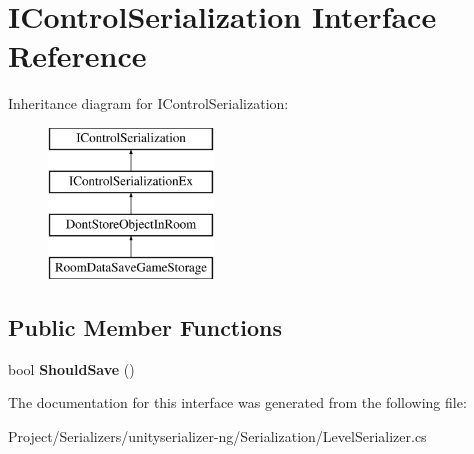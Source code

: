 \hypertarget{interface_i_control_serialization}{}\section{I\+Control\+Serialization Interface Reference}
\label{interface_i_control_serialization}
Inheritance diagram for I\+Control\+Serialization\+:\begin{figure}[H]
\begin{center}
\leavevmode
\includegraphics[height=4.000000cm]{interface_i_control_serialization}
\end{center}
\end{figure}
\subsection*{Public Member Functions}
\begin{DoxyCompactItemize}
\item 
\mbox{\label{interface_i_control_serialization_af1036cb8968dc0508a7d1804a4c1feed}} 
bool {\bfseries Should\+Save} ()
\end{DoxyCompactItemize}


The documentation for this interface was generated from the following file\+:\begin{DoxyCompactItemize}
\item 
Project/\+Serializers/unityserializer-\/ng/\+Serialization/Level\+Serializer.\+cs\end{DoxyCompactItemize}
